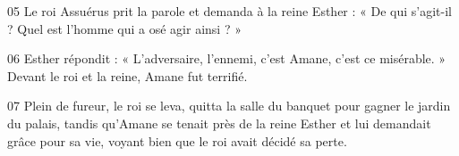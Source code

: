 
05 Le roi Assuérus prit la parole et demanda à la reine Esther : « De qui s’agit-il ? Quel est l’homme qui a osé agir ainsi ? »

06 Esther répondit : « L’adversaire, l’ennemi, c’est Amane, c’est ce misérable. » Devant le roi et la reine, Amane fut terrifié.

07 Plein de fureur, le roi se leva, quitta la salle du banquet pour gagner le jardin du palais, tandis qu’Amane se tenait près de la reine Esther et lui demandait grâce pour sa vie, voyant bien que le roi avait décidé sa perte.
